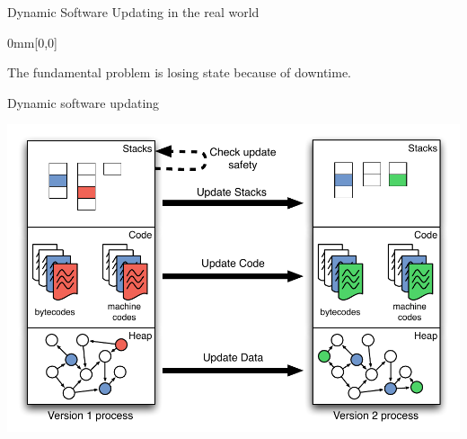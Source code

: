 \begin{frame}{Dynamic Software Updating in the real world}
{\begin{textblock*}{0mm}[0,0]
\end{textblock*}}
\end{frame}

\begin{frame}{}%
\begin{block}{}
\begin{center}
{\LARGE
The fundamental problem is losing state because of downtime.
}
\vspace{0.5ex}
\end{center}
\end{block}
\end{frame}

\begin{frame}{Dynamic software updating}%
\vspace*{-3mm}%
\begin{center}%
\includegraphics[scale=0.73]{images/process-state/both-process-state}%
\end{center}%
\end{frame}

